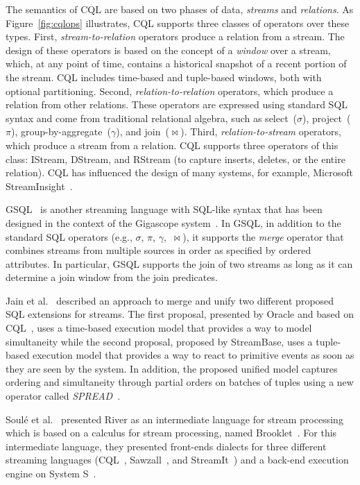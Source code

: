 The semantics of CQL are
based on two phases of data, \emph{streams} and \emph{relations}.
As Figure~\ref{fig:cqlops} illustrates, CQL
supports three classes of operators over these types. First,
\emph{stream-to-relation} operators produce a relation from a
stream.  The design of these operators is based on the concept of a
\emph{window} over a stream, which, at any point of time, contains a
historical snapshot of a recent portion of the stream. CQL includes
time-based and tuple-based windows, both with optional
partitioning. Second, \emph{relation-to-relation} operators, which
produce a relation from other relations. These operators are expressed
using standard SQL syntax and come from traditional relational
algebra, such as select~($\sigma$), project~($\pi$),
group-by-aggregate~($\gamma$), and join~($\bowtie$).
Third, \emph{rela\-tion-to-stream} operators, which produce a
stream from a relation. CQL supports three operators of this class:
IStream, DStream, and RStream (to capture inserts, deletes, or the entire
relation).  CQL has influenced the design of many
systems, for example, Microsoft StreamInsight~\cite{ali_et_al_2009}.

GSQL~\cite{cranor_et_al_2003} is another streaming  language with SQL-like syntax that has been designed in the context of the Gigascope system~\cite{cranor2003gigascope}. 
In GSQL, 
in addition to the standard SQL operators (e.g., $\sigma$, $\pi$,
$\gamma$,~$\bowtie$), it supports the \emph{merge} operator that
combines streams from multiple sources in order as specified by
ordered attributes.
In particular, GSQL supports the join of two streams as long as it can determine
a join window from the join predicates. 


Jain et al.~\cite{jain_et_al_2008} described an approach to merge and unify two different proposed SQL
extensions for streams. The first proposal, presented by Oracle and  based on CQL~\cite{arasu_babu_widom_2006},
uses a time-based execution model that provides a
way to model simultaneity while the second proposal, proposed by StreamBase, uses a
tuple-based execution model that provides a
way to react to primitive events as soon as they are seen by the
system. In addition, the proposed unified model  captures ordering and simultaneity through partial orders on
batches of tuples using a new operator called \emph{SPREAD}~\cite{jain_et_al_2008}. 

Soul\'{e} et al.~\cite{soule_et_al_2016} presented River as an intermediate language for stream processing which is based on 
a calculus for stream processing, named Brooklet~\cite{soule_et_al_2010}. For this intermediate language,
they presented front-ends dialects for three  different streaming languages (CQL~\cite{arasu_babu_widom_2006}, Sawzall~\cite{pike2005interpreting}, and StreamIt~\cite{thies_et_al_2002})  and a back-end execution engine on System S~\cite{amini2006spc}.
